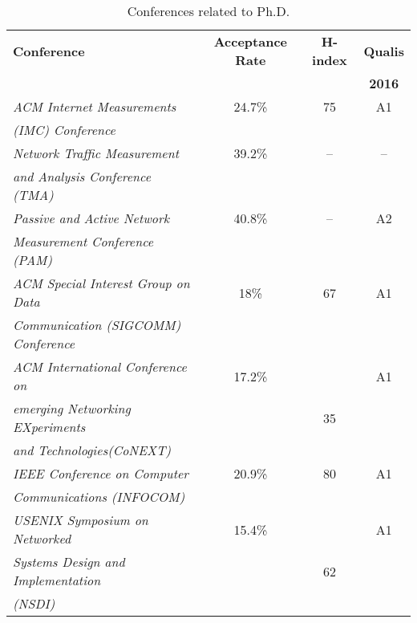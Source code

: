 	\begin{table}[htp]
	\centering
	\begin{tabularx}{\textwidth}{ l | c | c | c }
	\hline
	{\bf Conference} & {\bf Acceptance Rate} & \textbf{H-index} & \textbf{Qualis}      \\ 
	                          							  &  &  & \textbf{2016}        \\ \hline
	\textit{ACM Internet Measurements}                    &  24.7\% & 75 & A1          \\ 
	\textit{(IMC) Conference}   						  &         &    &             \\ \hline
	\textit{Network Traffic Measurement}                  &  39.2\% & -- & --          \\
	\textit{ and Analysis Conference (TMA)}               &         &    &             \\ \hline
	\textit{Passive and Active Network}                   &  40.8\% & -- & A2          \\
	\textit{ Measurement Conference (PAM)}                &         &    &             \\ \hline
	\textit{ACM Special Interest Group on Data}           &  18\%   & 67 & A1          \\
	\textit{Communication (SIGCOMM) Conference}           &         &    &             \\ \hline
	\textit{ACM International Conference on}              &  17.2\% &    & A1          \\
	\textit{emerging Networking EXperiments}	          &         & 35 &             \\
	\textit{and Technologies(CoNEXT)}                     &         &    &             \\ \hline
	\textit{IEEE Conference on Computer}                  &  20.9\% & 80 & A1          \\
	\textit{Communications (INFOCOM)}                     &         &    &             \\ \hline
	\textit{USENIX Symposium on Networked}                &  15.4\% &    & A1          \\
	\textit{Systems Design and Implementation}            &         & 62 &             \\
	\textit{(NSDI)}             				          &         &    &             \\ \hline

	\hline
	\end{tabularx}
	\caption{Conferences related to Ph.D.}
	\label{tbl:conferences}
	\end{table}